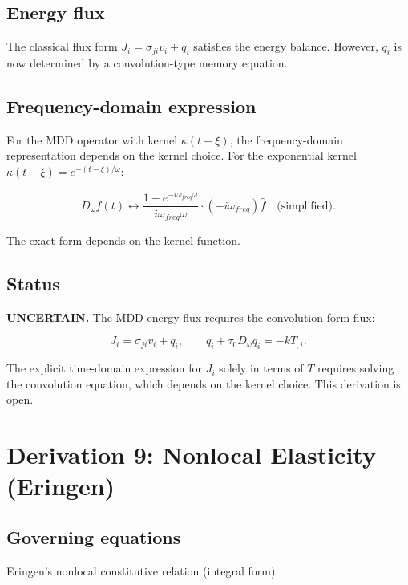 \documentclass{article}
\begin{document}
\subsection{Energy flux}

The classical flux form $J_i = \sigma_{ji}v_i + q_i$ satisfies the energy balance. However, $q_i$ is now determined by a convolution-type memory equation.

\subsection{Frequency-domain expression}

For the MDD operator with kernel $\kappa(t-\xi)$, the frequency-domain representation depends on the kernel choice. For the exponential kernel $\kappa(t-\xi) = e^{-(t-\xi)/\omega}$:

\begin{equation}
D_\omega f(t) \leftrightarrow \frac{1 - e^{-i\omega_{freq}\omega}}{i\omega_{freq}\omega} \cdot (-i\omega_{freq})\hat{f} \quad \text{(simplified)}.
\label{ef:mdd:4}
\end{equation}

The exact form depends on the kernel function.

\subsection{Status}

\textbf{UNCERTAIN.} The MDD energy flux requires the convolution-form flux:

\begin{equation}
J_i = \sigma_{ji}v_i + q_i,
\qquad q_i + \tau_0 D_\omega q_i = -k T_{,i}.
\label{ef:mdd:5}
\end{equation}

The explicit time-domain expression for $J_i$ solely in terms of $T$ requires solving the convolution equation, which depends on the kernel choice. This derivation is open.

\section{Derivation 9: Nonlocal Elasticity (Eringen)}

\subsection{Governing equations}

Eringen's nonlocal constitutive relation (integral form):
\end{document}
